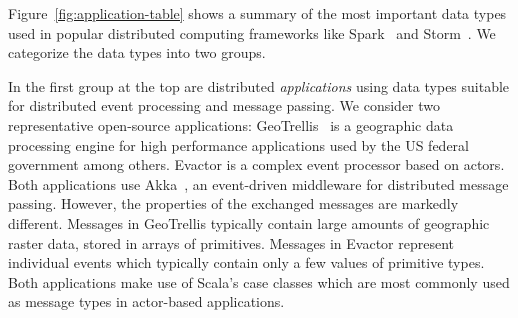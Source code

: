 \documentclass[preprint,10pt]{sigplanconf}
\theoremstyle{definition}
\theoremstyle{definition}
\begin{document}

Figure~\ref{fig:application-table} shows a summary of the most
important data types used in popular distributed computing frameworks
like Spark~\cite{Zaharia2012} and Storm~\cite{Storm}. We categorize the data
types into two groups.

In the first group at the top are distributed \emph{applications}
using data types suitable for distributed event processing and message
passing. We consider two representative open-source applications:
GeoTrellis~\cite{GeoTrellis} is a geographic data
processing engine for high performance applications used by the US
federal government among others.  Evactor is a complex event processor
based on actors. Both applications use Akka~\cite{Akka}, an
event-driven middleware for distributed message passing. However, the
properties of the exchanged messages are markedly different. Messages
in GeoTrellis typically contain large amounts of geographic raster
data, stored in arrays of primitives. Messages in Evactor represent
individual events which typically contain only a few values of
primitive types. Both applications make use of Scala's case classes
which are most commonly used as message types in actor-based
applications.
\end{document}
